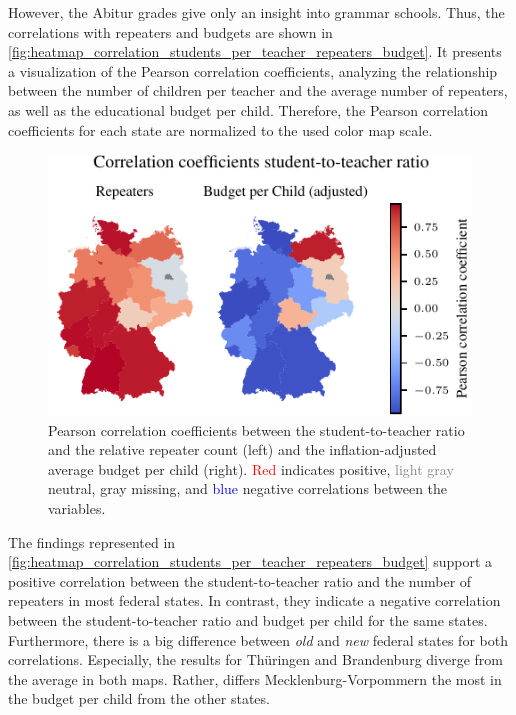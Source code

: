 
However, the Abitur grades give only an insight into grammar schools. Thus, the correlations with repeaters and budgets are shown in \autoref{fig:heatmap_correlation_students_per_teacher_repeaters_budget}. It presents a visualization of the Pearson correlation coefficients, analyzing the relationship between the number of children per teacher and the average number of repeaters, as well as the educational budget per child. Therefore, the Pearson correlation coefficients for each state are normalized to the used color map scale.

\begin{figure}[ht]
    \centering
    \includegraphics{fig/fig_heatmap_correlation_students_per_teacher_repeaters_budget.pdf}
    \caption{Pearson correlation coefficients between the student-to-teacher ratio and the relative repeater count (left) and the inflation-adjusted average budget per child (right). \textcolor{red}{Red} indicates positive, \textcolor{gray}{light gray} neutral, \textcolor{TUdark}{gray} missing, and \textcolor{blue}{blue} negative correlations between the variables.}
    \label{fig:heatmap_correlation_students_per_teacher_repeaters_budget}
\end{figure}

The findings represented in \autoref{fig:heatmap_correlation_students_per_teacher_repeaters_budget} support a  positive correlation between the student-to-teacher ratio and the number of repeaters in most federal states. In contrast, they indicate a negative correlation between the student-to-teacher ratio  and budget per child for the same states. Furthermore, there is a big difference between \emph{old} and \emph{new} federal states for both correlations. Especially, the results for Thüringen and Brandenburg diverge from the average in both maps. Rather, differs Mecklenburg-Vorpommern the most in the budget per child from the other states.

